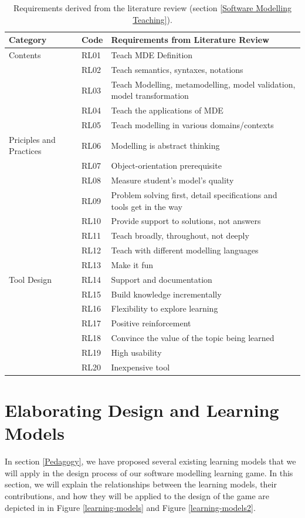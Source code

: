\documentclass[12pt, a4paper]{report}
\begin{document}
\begin{table}[ht]\caption{Requirements derived from the literature review (section \ref{Software Modelling Teaching}).}
\label{table:requirements}
\begin{center}
\begin{tabular}{ p{2cm}p{1cm}p{10cm} } 
\hline
Category & Code & Requirements from Literature Review \\
\hline
\multirow{1}{2cm}{Contents} 
& RL01 & Teach MDE Definition \\ 
& RL02 & Teach semantics, syntaxes, notations \\ 
& RL03 & Teach Modelling, metamodelling, model validation, model transformation\\
& RL04 & Teach the applications of MDE \\
& RL05 & Teach modelling in various domains/contexts \\

\hline
\multirow{1}{2cm}{Priciples and Practices} 
& RL06 & Modelling is abstract thinking \\ 
& RL07 & Object-orientation prerequisite \\
& RL08 & Measure student's model's quality \\
& RL09 & Problem solving first, detail specifications and tools get in the way \\
& RL10 & Provide support to solutions, not answers \\ 
& RL11 & Teach broadly, throughout, not deeply \\
& RL12 & Teach with different modelling languages \\  
& RL13 & Make it fun \\ 
\hline
\multirow{1}{2cm}{Tool Design}
& RL14 & Support and documentation \\
& RL15 & Build knowledge incrementally \\
& RL16 & Flexibility to explore learning \\
& RL17 & Positive reinforcement \\
& RL18 & Convince the value of the topic being learned \\ 
& RL19 & High usability \\ 
& RL20 & Inexpensive tool \\ 
\hline
\end{tabular}
\end{center}
\end{table}

\section{Elaborating Design and Learning Models}
\label{Elaborating Design and Learning Models}
In section \ref{Pedagogy}, we have proposed several existing learning models that we will apply in the design process of our software modelling learning game. In this section, we will explain the relationships between the learning models, their contributions, and how they will be applied to the design of the game are depicted in in Figure \ref{learning-models} and Figure \ref{learning-models2}.
\end{document}
